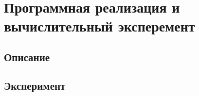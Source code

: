 \chapter{Программная реализация и вычислительный эксперемент}
\section{Описание}
\section{Эксперимент}